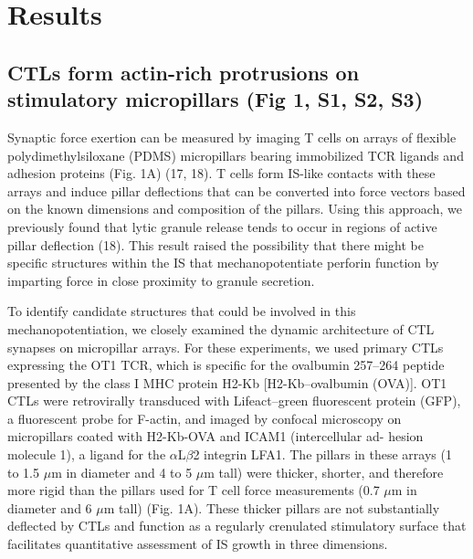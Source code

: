 \section{Results} 

\subsection{CTLs form actin-rich protrusions on stimulatory micropillars (Fig 1, S1, S2, S3)}
Synaptic force exertion can be measured by imaging T cells on arrays of flexible polydimethylsiloxane (PDMS) micropillars bearing immobilized TCR ligands and adhesion proteins (Fig. 1A) (17, 18). T cells form IS-like contacts with these arrays and induce pillar deflections that can be converted into force vectors based on the known dimensions and composition of the pillars. Using this approach, we previously found that lytic granule release tends to occur in regions of active pillar deflection (18). This result raised the possibility that there might be specific structures within the IS that mechanopotentiate perforin function by imparting force in close proximity to granule secretion.

To identify candidate structures that could be involved in this mechanopotentiation, we closely examined the dynamic architecture of CTL synapses on micropillar arrays. For these experiments, we used primary CTLs expressing the OT1 TCR, which is specific for the ovalbumin 257–264 peptide presented by the class I MHC protein H2-Kb [H2-Kb–ovalbumin (OVA)]. OT1 CTLs were retrovirally transduced with Lifeact–green fluorescent protein (GFP), a fluorescent probe for F-actin, and imaged by confocal microscopy on micropillars coated with H2-Kb-OVA and ICAM1 (intercellular ad- hesion molecule 1), a ligand for the $\alpha$L$\beta$2 integrin LFA1. The pillars in these arrays (1 to 1.5 $\mu$m in diameter and 4 to 5 $\mu$m tall) were thicker, shorter, and therefore more rigid than the pillars used for T cell force measurements (0.7 $\mu$m in diameter and 6 $\mu$m tall) (Fig. 1A). These thicker pillars are not substantially deflected by CTLs and function as a regularly crenulated stimulatory surface that facilitates quantitative assessment of IS growth in three dimensions.


